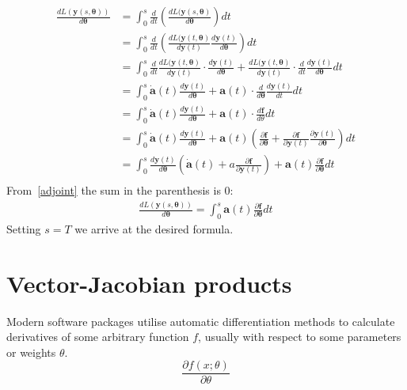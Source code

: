 \documentclass{article}
\begin{document}
    \begin{align*}
        \frac{ d L(\bm{y}(s, \bm{\theta})) }{ d \bm{\theta} }
        &= \int_0^s \frac{d}{dt} \left( \frac{ d L(\bm{y}(s, \bm{\theta})}{ d \bm{\theta}} \right) dt \\
        &= \int_0^s \frac{d}{dt} \left( \frac{ d L(\bm{y}(t, \bm{\theta})}{ d \bm{y}(t)} \frac{d \bm{y}(t)}{d\bm{\theta}} \right) dt \\
        &= \int_0^s
        \frac{d}{dt} \frac{ d L(\bm{y}(t, \bm{\theta})}{ d \bm{y}(t)} \cdot \frac{d \bm{y}(t)}{d\bm{\theta}}
        +
        \frac{ d L(\bm{y}(t, \bm{\theta})}{ d \bm{y}(t)} \cdot \frac{d}{dt} \frac{d \bm{y}(t)}{d\bm{\theta}}
        dt \\
        &= \int_0^s
        \dot{\bm{a}}(t) \frac{d \bm{y}(t)}{d\bm{\theta}}
        +
        \bm{a}(t) \cdot \frac{d}{d\bm{\theta}} \frac{d \bm{y}(t)}{dt}
        dt \\
        &= \int_0^s
        \dot{\bm{a}}(t) \frac{d \bm{y}(t)}{d\bm{\theta}}
        +
        \bm{a}(t) \cdot \frac{d\bm{f}}{d\theta}
        dt \\
        &= \int_0^s
        \dot{\bm{a}}(t) \frac{d \bm{y}(t)}{d\bm{\theta}}
        +
        \bm{a}(t) \left( \frac{\partial \bm{f}}{\partial \bm{\theta}}
        +
        \frac{\partial \bm{f}}{\partial \bm{y}(t)} \frac{\partial \bm{y}(t)}{\partial \bm{\theta}}\right)
        dt \\
        &= \int_0^s
        \frac{d \bm{y}(t)}{d\bm{\theta}}
        \left( \dot{\bm{a}}(t) + a\frac{\partial \bm{f}}{\partial \bm{y}(t)} \right)
        +
        \bm{a}(t) \frac{\partial \bm{f}}{\partial \bm{\theta}}
        dt \\
    \end{align*}
    From~\eqref{adjoint} the sum in the parenthesis is 0:
    \begin{align}
        \frac{ d L(\bm{y}(s, \bm{\theta})) }{ d \bm{\theta} }
        = \int_0^s
        \bm{a}(t) \frac{\partial \bm{f}}{\partial \bm{\theta}}
        dt
    \end{align}
    Setting $s=T$ we arrive at the desired formula.


    \section{Vector-Jacobian products}
    Modern software packages utilise automatic differentiation methods to calculate derivatives of some arbitrary function $f$, usually with respect to some parameters or weights $\theta$.
    \begin{equation}
        \frac{\partial f(x; \theta)}{ \partial \theta}
    \end{equation}
\end{document}
